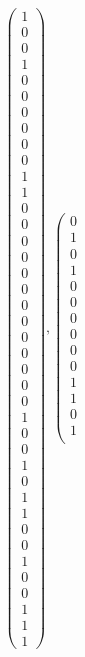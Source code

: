 \documentclass[8pt]{article}
\begin{document}
 \begin{align*} \left(\begin{array}{r}
1 \\
0 \\
0 \\
1 \\
0 \\
0 \\
0 \\
0 \\
0 \\
0 \\
1 \\
1 \\
0 \\
0 \\
0 \\
0 \\
0 \\
0 \\
0 \\
0 \\
0 \\
0 \\
0 \\
0 \\
0 \\
1 \\
0 \\
0 \\
1 \\
0 \\
1 \\
1 \\
0 \\
0 \\
1 \\
0 \\
0 \\
1 \\
1 \\
1
\end{array}\right) ,
 \left(\begin{array}{r}
0 \\
1 \\
0 \\
1 \\
0 \\
0 \\
0 \\
0 \\
0 \\
0 \\
1 \\
1 \\
0 \\
1 \\

\end{array}
\end{align*}
\end{document}
